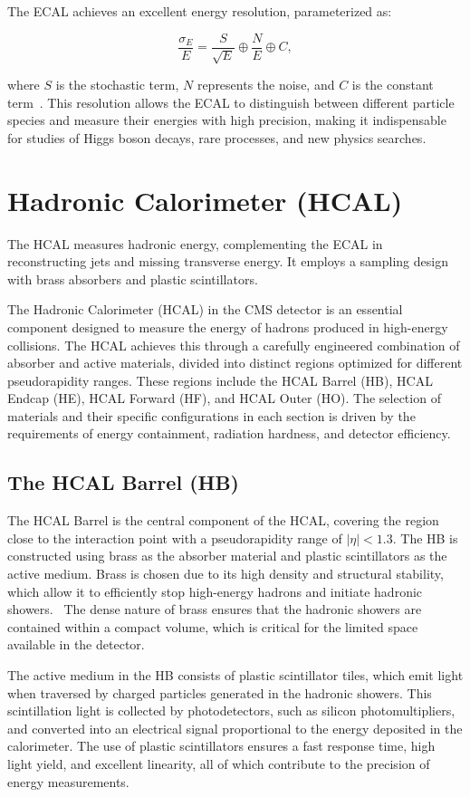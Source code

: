 The ECAL achieves an excellent energy resolution, parameterized as:

\[
\frac{\sigma_E}{E} = \frac{S}{\sqrt{E}} \oplus \frac{N}{E} \oplus C,
\]

where $S$ is the stochastic term, $N$ represents the noise, and $C$ is the constant term~\cite{ecal_tdr}. This resolution allows the ECAL to distinguish between different particle species and measure their energies with high precision, making it indispensable for studies of Higgs boson decays, rare processes, and new physics searches.

\section{Hadronic Calorimeter (HCAL)}
The HCAL measures hadronic energy, complementing the ECAL in reconstructing jets and missing transverse energy. It employs a sampling design with brass absorbers and plastic scintillators.

The Hadronic Calorimeter (HCAL) in the CMS detector is an essential component designed to measure the energy of hadrons produced in high-energy collisions. The HCAL achieves this through a carefully engineered combination of absorber and active materials, divided into distinct regions optimized for different pseudorapidity ranges. These regions include the HCAL Barrel (HB), HCAL Endcap (HE), HCAL Forward (HF), and HCAL Outer (HO). The selection of materials and their specific configurations in each section is driven by the requirements of energy containment, radiation hardness, and detector efficiency.

\subsection{The HCAL Barrel (HB)}
The HCAL Barrel is the central component of the HCAL, covering the region close to the interaction point with a pseudorapidity range of $|\eta| < 1.3$. The HB is constructed using brass as the absorber material and plastic scintillators as the active medium. Brass is chosen due to its high density and structural stability, which allow it to efficiently stop high-energy hadrons and initiate hadronic showers.~\cite{hcal_tdr} The dense nature of brass ensures that the hadronic showers are contained within a compact volume, which is critical for the limited space available in the detector.

The active medium in the HB consists of plastic scintillator tiles, which emit light when traversed by charged particles generated in the hadronic showers. This scintillation light is collected by photodetectors, such as silicon photomultipliers, and converted into an electrical signal proportional to the energy deposited in the calorimeter. The use of plastic scintillators ensures a fast response time, high light yield, and excellent linearity, all of which contribute to the precision of energy measurements.

